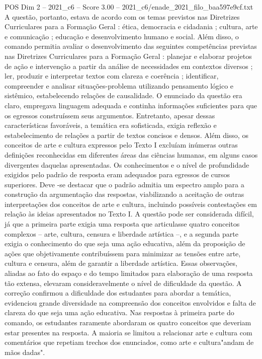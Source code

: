 \begin{textsample}{POS Dim 2 – 2021\_c6 – Score 3.00 – 2021\_c6/enade\_2021\_filo\_baa597e9cf.txt}
A questão, portanto, estava de acordo com os temas previstos nas Diretrizes Curriculares para a Formação Geral : ética, democracia e cidadania ; cultura, arte e comunicação ; educação e desenvolvimento humano e social.
Além disso, o comando permitia avaliar o desenvolvimento das seguintes competências previstas nas Diretrizes Curriculares para a Formação Geral : planejar e elaborar projetos de ação e intervenção a partir da análise de necessidades em contextos diversos ; ler, produzir e interpretar textos com clareza e coerência ; identificar, compreender e analisar situações-problema utilizando pensamento lógico e sistêmico, estabelecendo relações de causalidade.
O enunciado da questão era claro, empregava linguagem adequada e continha informações suficientes para que os egressos construíssem seus argumentos.
Entretanto, apesar dessas características favoráveis, a temática era sofisticada, exigia reflexão e estabelecimento de relações a partir de textos concisos e densos.
Além disso, os conceitos de arte e cultura expressos pelo Texto I excluíam inúmeras outras definições reconhecidas em diferentes áreas das ciências humanas, em alguns casos divergentes daquelas apresentadas.
Os conhecimentos e o nível de profundidade exigidos pelo padrão de resposta eram adequados para egressos de cursos superiores.
Deve -se destacar que o padrão admitia um espectro amplo para a construção da argumentação das respostas, viabilizando a aceitação de outras interpretações dos conceitos de arte e cultura, incluindo possíveis contestações em relação às ideias apresentados no Texto I.
A questão pode ser considerada difícil, já que a primeira parte exigia uma resposta que articulasse quatro conceitos complexos – arte, cultura, censura e liberdade artística –, e a segunda parte exigia o conhecimento do que seja uma ação educativa, além da proposição de ações que objetivamente contribuíssem para minimizar as tensões entre arte, cultura e censura, além de garantir a liberdade artística.
Essas observações, aliadas ao fato do espaço e do tempo limitados para elaboração de uma resposta tão extensa, elevaram consideravelmente o nível de dificuldade da questão.
A correção confirmou a dificuldade dos estudantes para abordar a temática, evidenciou grande diversidade na compreensão dos conceitos envolvidos e falta de clareza do que seja uma ação educativa.
Nas respostas à primeira parte do comando, os estudantes raramente abordaram os quatro conceitos que deveriam estar presentes na resposta.
A maioria se limitou a relacionar arte e cultura com comentários que repetiam trechos dos enunciados, como arte e cultura"andam de mãos dadas".

\end{textsample}
